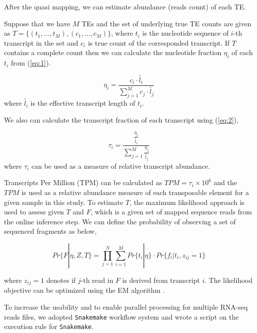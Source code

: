 \documentclass[wsdraft]{ws-procs11x85}
\begin{document}
After the quasi mapping, 
we can estimate abundance (reads count) of each TE. 

Suppose that
we have $M$ TEs and the set of underlying true TE counts are given as
$T = \{(t_1, \dots , t_M), (c_1, \dots, c_M) \}$, where $t_i$ is the nucleotide sequence of $i$-th transcript in the set and $c_i$ is true count of the corresponded transcript. 
If $T$ contains a complete count then we can calculate the nucleotide fraction $\eta_i$ of each $t_i$ from (\ref{eq:1}).\cite{li2009rna}

 
\begin{equation} \label{eq:1}
\eta_i = \frac{c_i \cdot \widetilde{l_i} }{\sum_{j=1}^{M} c_j \cdot \widetilde{l_j}}
\end{equation}
where $\widetilde{l_i}$ is the effective transcript length of $t_i$\cite{li2009rna}.

We also can calculate the transcript fraction of each transcript using (\ref{eq:2}),

\begin{equation} \label{eq:2}
\tau_i = \frac{ \frac{\eta_i }{\widetilde{l_i}} }
{\sum_{j=1}^{M} \frac{\eta_j }{\widetilde{l_j}} }
\end{equation}
where $\tau_i$ can be used as a measure of relative transcript abundance.


Transcripts Per Million (TPM) can be calculated as $TPM=\tau_i \times 10^6$ and the $TPM$ is used as a relative abundance measure of each transposable element for a given sample in this study. To estimate $T$, the maximum likelihood approach is used to assess given $T$ and $F$, which is a given set of mapped sequence reads from  the online inference step. We can define the probability of observing a set of sequenced fragments as below,

\begin{equation} \label{eq:3}
Pr\{F|\eta,Z, T \}=
\prod_{j=1}^{N}\sum_{i=1}^{M} Pr\{ t_i | \eta \}  \cdot
 Pr \{ f_i | t_i , z_{ij} = 1 \}
\end{equation}

where $z_{ij} = 1$ denotes if $j$-th read in $F$ is derived from transcript $i$. The likelihood objective can be optimized using the EM algorithm \cite{li2009rna}.

To increase the usability and to enable parallel processing for multiple RNA-seq reads files, we adopted \verb|Snakemake| workflow system and wrote a script on the execution rule for \verb|Snakemake|.\cite{koster2012snakemake}
\end{document}
